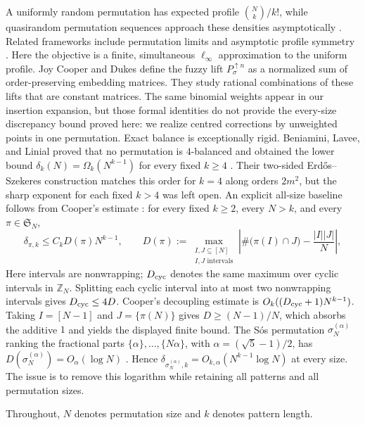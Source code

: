 \documentclass[11pt,letterpaper]{article}
\newcommand{\Ssym}{\mathfrak S}
\begin{document}
A uniformly random permutation has expected profile $\binom Nk/k!$, while
quasirandom permutation sequences approach these densities asymptotically
\cite{Cooper,KralPikhurko}. Related frameworks include permutation limits
\cite{HoppenEtAl} and asymptotic profile symmetry \cite{CooperPetrarca}.
Here the objective is a finite, simultaneous $\ell_\infty$
approximation to the uniform profile.  Joy Cooper and Dukes
\cite[equation~(1.2)]{CooperDukesFuzzy} define the fuzzy lift
$P_\sigma^{\uparrow n}$ as a normalized sum of order-preserving embedding
matrices.  They study rational combinations of these lifts that are constant
matrices.  The same binomial weights appear in our insertion expansion,
but those formal identities do not provide the every-size discrepancy bound
proved here: we realize centred corrections by unweighted points in one
permutation.
Exact balance is exceptionally rigid.  Beniamini, Lavee, and Linial
proved that no permutation is $4$-balanced and obtained the lower bound
$\delta_k(N)=\Omega_k(N^{k-1})$ for every fixed $k\ge4$
\cite[Theorems~6 and 7]{BLL}.  Their two-sided Erd\H{o}s--Szekeres
construction matches this order for $k=4$ along orders $2m^2$, but the
sharp exponent for each fixed $k>4$ was left open.
An explicit all-size baseline follows from Cooper's estimate
\cite[Theorem~3.1 and the proof of Proposition~3.4]{Cooper}:
for every fixed $k\ge2$, every $N>k$, and every $\pi\in\Ssym_N$,
\[
 \delta_{\pi,k}\le C_kD(\pi)N^{k-1},\qquad
 D(\pi):=\max_{\substack{I,J\subseteq[N]\\ I,J\text{ intervals}}}
 \left|\#\bigl(\pi(I)\cap J\bigr)-\frac{|I||J|}{N}\right|,
\]
Here intervals are nonwrapping; $D_{\rm cyc}$ denotes the same maximum
over cyclic intervals in $\mathbb Z_N$.  Splitting each cyclic interval into
at most two nonwrapping intervals gives $D_{\rm cyc}\le4D$.
Cooper's decoupling estimate is $O_k((D_{\rm cyc}+1)N^{k-1})$.
Taking $I=[N-1]$ and $J=\{\pi(N)\}$ gives $D\ge(N-1)/N$,
which absorbs the additive $1$ and yields the displayed finite bound.  The S\'os permutation
$\sigma_N^{(\alpha)}$ ranking the fractional parts $\{\alpha\},\ldots,\{N\alpha\}$, with
$\alpha=(\sqrt5-1)/2$, has $D(\sigma_N^{(\alpha)})=O_\alpha(\log N)$
\cite[Theorem~3.24]{CooperArithmetic}.  Hence
$\delta_{\sigma_N^{(\alpha)},k}=O_{k,\alpha}(N^{k-1}\log N)$ at every size.
The issue is to remove this logarithm while retaining all patterns and
all permutation sizes.

Throughout, $N$ denotes permutation size and $k$ denotes pattern length.
\end{document}
